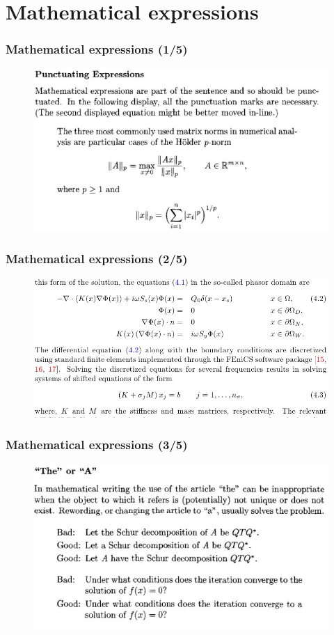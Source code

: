 \documentclass{beamer}
\begin{document}
\section{Mathematical expressions}
\begin{frame}
\frametitle{Mathematical expressions (1/5)}
\begin{figure}[t]
 \includegraphics[width=\textwidth]{images/punct.jpeg}
\end{figure}
\end{frame}
\begin{frame}
\frametitle{Mathematical expressions (2/5)}
\begin{figure}[t]
 \includegraphics[width=\textwidth]{images/double.jpeg}
\end{figure}
\end{frame}
\begin{frame}
\frametitle{Mathematical expressions (3/5)}
\begin{figure}[t]
 \includegraphics[width=\textwidth]{images/thea.jpeg}
\end{figure}
\end{frame}
\end{document}
